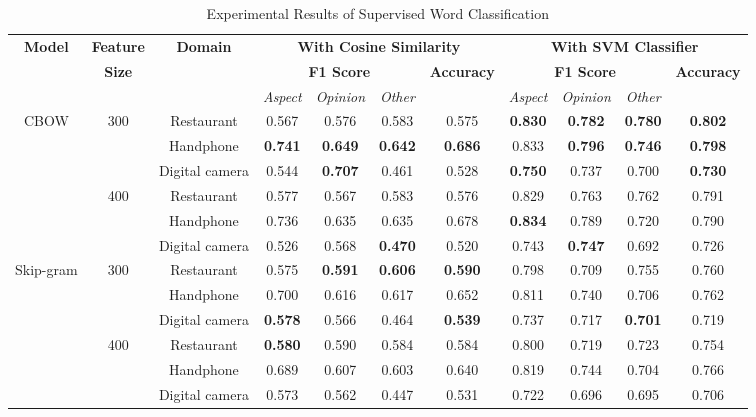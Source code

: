 \documentclass[a4paper,conference]{IEEEtran}
\begin{document}
\begin{table}[htbp]
\caption{Experimental Results of Supervised Word Classification}
\begin{center}
\begin{tabular}{|c|c|c|c|c|c|c|c|c|c|c|}
\hline
\textbf{Model}&\textbf{Feature}&\textbf{Domain}&\multicolumn{4}{|c|}{\textbf{With Cosine Similarity}}&\multicolumn{4}{|c|}{\textbf{With SVM Classifier}}\\
\cline{4-11}
&\textbf{Size}& &\multicolumn{3}{|c|}{\textbf{F1 Score}}&\textbf{Accuracy}&\multicolumn{3}{|c|}{\textbf{F1 Score}}&\textbf{Accuracy}\\
\cline{4-6}\cline{8-10}
& & &\textit{Aspect}&\textit{Opinion}&\textit{Other}& &\textit{Aspect}&\textit{Opinion}&\textit{Other}& \\
\hline
CBOW&300&Restaurant&0.567&0.576&0.583&0.575&\textbf{0.830}&\textbf{0.782}&\textbf{0.780}&\textbf{0.802} \\
\cline{3-11}
&&Handphone&\textbf{0.741}&\textbf{0.649}&\textbf{0.642}&\textbf{0.686}&0.833&\textbf{0.796}&\textbf{0.746}&\textbf{0.798} \\
\cline{3-11}
&&Digital camera&0.544&\textbf{0.707}&0.461&0.528&\textbf{0.750}&0.737&0.700&\textbf{0.730} \\
\cline{2-11}
&400&Restaurant&0.577&0.567&0.583&0.576&0.829&0.763&0.762&0.791 \\
\cline{3-11}
&&Handphone&0.736&0.635&0.635&0.678&\textbf{0.834}&0.789&0.720&0.790 \\
\cline{3-11}
&&Digital camera&0.526&0.568&\textbf{0.470}&0.520&0.743&\textbf{0.747}&0.692&0.726 \\
\hline
Skip-gram&300&Restaurant&0.575&\textbf{0.591}&\textbf{0.606}&\textbf{0.590}&0.798&0.709&0.755&0.760 \\
\cline{3-11}
&&Handphone&0.700&0.616&0.617&0.652&0.811&0.740&0.706&0.762 \\
\cline{3-11}
&&Digital camera&\textbf{0.578}&0.566&0.464&\textbf{0.539}&0.737&0.717&\textbf{0.701}&0.719 \\
\cline{2-11}
&400&Restaurant&\textbf{0.580}&0.590&0.584&0.584&0.800&0.719&0.723&0.754 \\
\cline{3-11}
&&Handphone&0.689&0.607&0.603&0.640&0.819&0.744&0.704&0.766 \\
\cline{3-11}
&&Digital camera&0.573&0.562&0.447&0.531&0.722&0.696&0.695&0.706 \\
\hline
\end{tabular}
\label{tab6}
\end{center}
\end{table}
\end{document}

